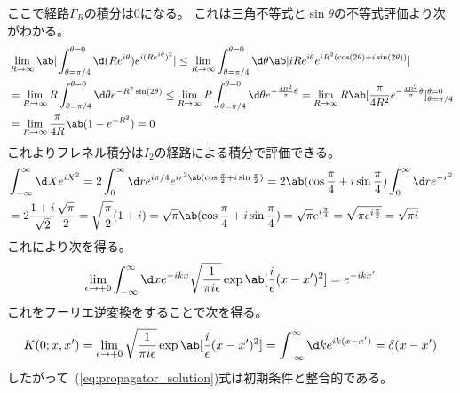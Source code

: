 ここで経路$\Gamma_R$の積分は0になる。
これは三角不等式と$\sin\theta$の不等式評価より次がわかる。
\begin{equation}
  \begin{split}
    &\lim_{R\to\infty}
    \ab|\int_{\theta=\pi/4}^{\theta=0}
    \d (Re^{i\theta})e^{i(Re^{i\theta})^2}|
    \leq\lim_{R\to\infty}
    \int_{\theta=\pi/4}^{\theta=0}
    \d\theta \ab|iRe^{i\theta}
    e^{iR^2(\cos(2\theta)+i\sin(2\theta))}| \\
    &=\lim_{R\to\infty}
    R \int_{\theta=\pi/4}^{\theta=0}
    \d\theta
    e^{-R^2\sin(2\theta)}
    \leq\lim_{R\to\infty}
    R \int_{\theta=\pi/4}^{\theta=0}
    \d\theta
    e^{-\frac{4R^2}{\pi}\theta}
    =\lim_{R\to\infty}
    R\ab[
    \frac{\pi}{4R^2}e^{-\frac{4R^2}{\pi}\theta}
    ]_{\theta=\pi/4}^{\theta=0} \\
    &=\lim_{R\to\infty}
    \frac{\pi}{4R}\ab(1-e^{-R^2})=0
  \end{split}
\end{equation}
これよりフレネル積分は$I_2$の経路による積分で評価できる。
\begin{equation}
  \begin{split}
    &\int_{-\infty}^\infty\d Xe^{iX^2}
    =2\int_{0}^\infty\d r
    e^{i\pi/4}e^{ir^2\ab(\cos\frac{\pi}{2}+i\sin\frac{\pi}{2})}
    =2\ab(\cos\frac{\pi}{4}+i\sin\frac{\pi}{4})
    \int_{0}^\infty\d r e^{-r^2} \\
    &=2\frac{1+i}{\sqrt{2}}\frac{\sqrt{\pi}}{2}
    =\sqrt{\frac{\pi}{2}}(1+i)
    =\sqrt{\pi}
    \ab(\cos\frac{\pi}{4}+i\sin\frac{\pi}{4})
    =\sqrt{\pi}e^{i\frac{\pi}{4}}
    =\sqrt{\pi e^{i\frac{\pi}{2}}}
    =\sqrt{\pi i}
  \end{split}
\end{equation}
これにより次を得る。
\begin{equation}
  \lim_{\epsilon\to+0}
  \int_{-\infty}^\infty\d x
  e^{-ikx}
  \sqrt{\frac{1}{\pi i\epsilon}}
  \exp\ab[
    \frac{i}{\epsilon}(x-x')^2
  ]
  =e^{-ikx'}
\end{equation}
これをフーリエ逆変換をすることで次を得る。
\begin{equation}
  K(0;x,x')
  =\lim_{\epsilon\to+0}
  \sqrt{\frac{1}{\pi i\epsilon}}
  \exp\ab[
    \frac{i}{\epsilon}(x-x')^2
  ]
  =\int_{-\infty}^\infty\d k e^{ik(x-x')}
  =\delta(x-x')
\end{equation}
したがって~(\ref{eq:propagator_solution})式は初期条件と整合的である。

